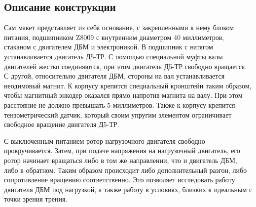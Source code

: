 \subsection{Описание конструкции}

Сам макет представляет из себя основание, с закрепленными к нему блоком питания, подшипником Z8009 
с внутренним диаметром 40 миллиметров, стаканом с двигателем ДБМ и электроникой. 
В подшипник с натягом устанавливается двигатель Д5-ТР. С помощью специальной муфты валы двигателей
жестко соединяются, при этом двигатель Д5-ТР свободно вращается. С другой, относительно двигателя ДБМ,
стороны на вал устанавливается неодимовый магнит. К корпусу крепится специальный кронштейн таким 
образом, чтобы магнитный энкодер оказался прямо напротив магнита на валу. При этом расстояние не должно
превышать 5 миллиметров. Также к корпусу крепится тензометрический
датчик, который своим упругим элементом ограничивает свободное вращение двигателя Д5-ТР.

С выключенным питанием ротор нагрузочного двигателя свободно прокручивается. Затем, при подаче
напряжения на нагрузочный двигатель, его ротор начинает вращаться либо в том же направлении, что и 
двигатель ДБМ, либо в обратном. Таким образом происходит либо дополнительный разгон, либо 
сопротивление вращению соответственно. Это позволяет исследовать работу двигателя ДБМ под нагрузкой,
а также работу в условиях, близких к идеальным с точки зрения трения.

